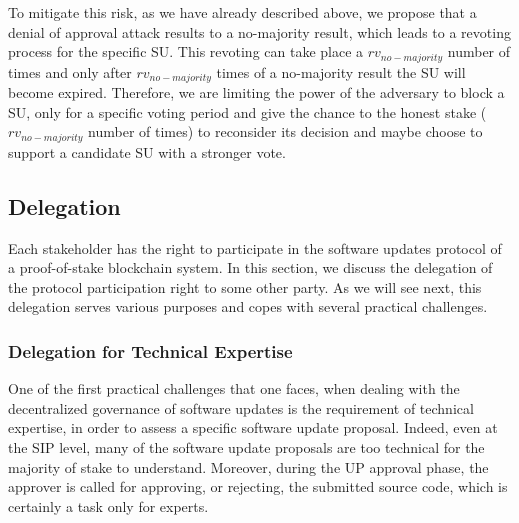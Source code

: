  To mitigate this risk, as we have already described above, we propose that a denial of approval attack results to a no-majority result, which leads to a revoting process for the specific SU. This revoting can take place a $rv_{no-majority}$ number of times and only after $rv_{no-majority}$ times of a no-majority result the SU will become expired. Therefore, we are limiting the power of the adversary to block a SU, only for a specific voting period and give the chance to the honest stake ($rv_{no-majority}$ number of times) to reconsider its decision and maybe choose to support a candidate SU with a stronger vote.

\subsection{Delegation} \label{appxdelegation}
Each stakeholder has the right to participate in the software updates protocol of a proof-of-stake blockchain system.
In this section, we discuss the delegation of the protocol participation right to some other party. As we will see next, this delegation serves various purposes and copes with several practical challenges.
\subsubsection{Delegation for Technical Expertise}\label{delfortech}
One of the first practical challenges that one faces, when dealing with the decentralized governance of software updates is the requirement of technical expertise, in order to assess a specific software update proposal. Indeed, even at the SIP level, many of the software update proposals are too technical for the majority of stake to understand. Moreover, during the UP approval phase, the approver is called for approving, or rejecting, the submitted source code, which is certainly a task only for experts.

